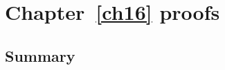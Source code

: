 \chapter{Chapter~\ref{ch16} proofs}

\newpage
\section{Summary}\label{ch16.ps.summary}
\lpscriptsummary
